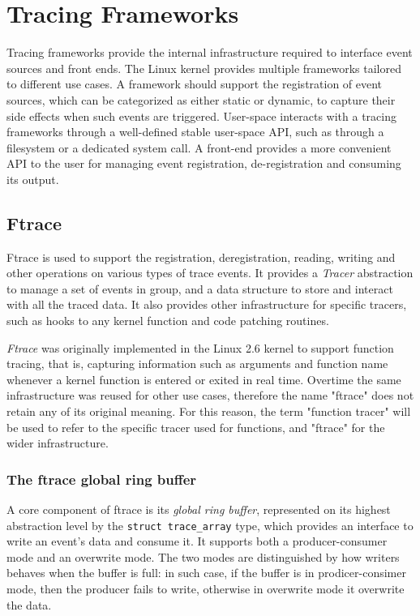 \section{Tracing Frameworks}

Tracing frameworks provide the internal infrastructure required to interface
event sources and front ends. The Linux kernel provides multiple frameworks
tailored to different use cases. A framework should support the registration of
event sources, which can be categorized as either static or dynamic, to capture
their side effects when such events are triggered. User-space interacts with a
tracing frameworks through a well-defined stable user-space API, such as through
a filesystem or a dedicated system call. A front-end provides a more convenient
API to the user for managing event registration, de-registration and consuming
its output.

\subsection{Ftrace}

Ftrace is used to support the registration, deregistration, reading, writing and
other operations on various types of trace events. It provides a \textit{Tracer}
abstraction to manage a set of events in group, and a data structure to store
and interact with all the traced data. It also provides other infrastructure for
specific tracers, such as hooks to any kernel function and code patching
routines.

\textit{Ftrace} was originally implemented in the Linux 2.6 kernel to support
function tracing, that is, capturing information such as arguments and function
name whenever a kernel function is entered or exited in real time. Overtime the
same infrastructure was reused for other use cases, therefore the name "ftrace"
does not retain any of its original meaning. For this reason, the term "function
tracer" will be used to refer to the specific tracer used for functions, and
"ftrace" for the wider infrastructure.

\subsubsection*{The ftrace global ring buffer}

A core component of ftrace is its \textit{global ring buffer}, represented on
its highest abstraction level by the \verb|struct trace_array| type, which
provides an interface to write an event's data and consume it. It supports both
a producer-consumer mode and an overwrite mode. The two modes are distinguished
by how writers behaves when the buffer is full: in such case, if the buffer is
in prodicer-consimer mode, then the producer fails to write, otherwise in
overwrite mode it overwrite the data.

